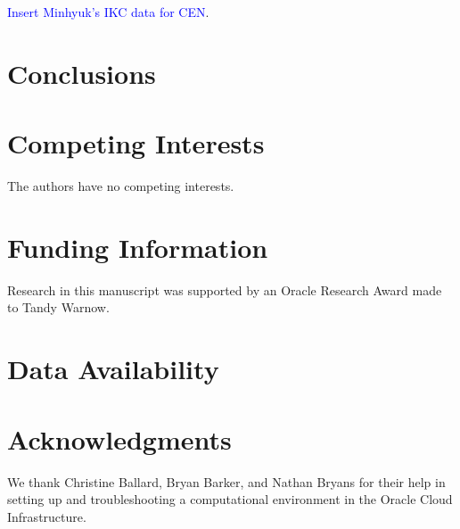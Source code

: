 \documentclass[a4paper]{article}   	%
\begin{document}
\textcolor{blue}{Insert Minhyuk's IKC data for CEN}.



\section{Conclusions}

\section*{Competing Interests} \vspace{3mm} The authors have no competing interests.

\section*{Funding Information} Research in this manuscript was supported by an Oracle Research Award made to Tandy Warnow. 

\section*{Data Availability}

\section*{Acknowledgments} We thank Christine Ballard, Bryan Barker, and Nathan Bryans for their help in setting up and troubleshooting a computational environment in the Oracle Cloud Infrastructure. 



\end{document}
